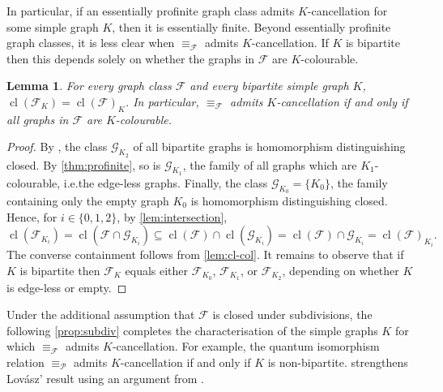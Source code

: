 \documentclass[3p,final]{elsarticle}
\DeclareMathOperator{\cl}{cl}
\newtheorem{lemma}[theorem]{Lemma}
\begin{document}
	In particular, if an essentially profinite graph class admits $K$-cancellation for some simple graph $K$, then it is essentially finite.
	Beyond essentially profinite graph classes, it is less clear when $\equiv_{\mathcal{F}}$ admits $K$-cancellation.
	If $K$ is bipartite then this depends solely on whether the graphs in $\mathcal{F}$ are $K$-colourable.


	\begin{lemma} \label{cor:bipartite-exception}
		For every graph class $\mathcal{F}$ and every bipartite simple graph $K$, $\cl(\mathcal{F}_K) =  \cl(\mathcal{F})_K$.
		In particular, $\equiv_{\mathcal{F}}$ admits $K$-cancellation if and only if all graphs in $\mathcal{F}$ are $K$-colourable.
	\end{lemma}
	\begin{proof}
		By \cite[Lemma~5.8]{roberson_oddomorphisms_2022}, the class $\mathcal{G}_{K_2}$ of all bipartite graphs is homomorphism distinguishing closed.
		By \cref{thm:profinite}, so is $\mathcal{G}_{K_1}$, the family of all graphs which are $K_1$-colourable, i.e.\@ the edge-less graphs.
		Finally, the class $\mathcal{G}_{K_0} = \{K_0\}$, the family containing only the empty graph $K_0$ is homomorphism distinguishing closed.
		Hence, for $i \in \{0,1,2\}$, by \cref{lem:intersection},
		\[
		\cl(\mathcal{F}_{K_i}) = \cl(\mathcal{F} \cap \mathcal{G}_{K_i}) \subseteq \cl(\mathcal{F}) \cap \cl(\mathcal{G}_{K_i}) = \cl(\mathcal{F}) \cap \mathcal{G}_{K_i} = \cl(\mathcal{F})_{K_i}.
		\]
		The converse containment follows from \cref{lem:cl-col}.
		It remains to observe that if $K$ is bipartite then $\mathcal{F}_K$ equals either $\mathcal{F}_{K_0}$, $\mathcal{F}_{K_1}$, or $\mathcal{F}_{K_2}$, depending on whether $K$ is edge-less or empty.
	\end{proof}

	Under the additional assumption that $\mathcal{F}$ is closed under subdivisions, the following \cref{prop:subdiv} completes the characterisation of the simple graphs $K$ for which $\equiv_{\mathcal{F}}$ admits $K$-cancellation.
	For example, the quantum isomorphism relation $\equiv_{\mathcal{P}}$ \cite{mancinska_quantum_2019} admits $K$-cancellation if and only if $K$ is non-bipartite.
	 strengthens Lov\'asz' result \cite{lovasz_cancellation_1971} using an argument from \cite{dvorak_recognizing_2010}.
	
\end{document}
